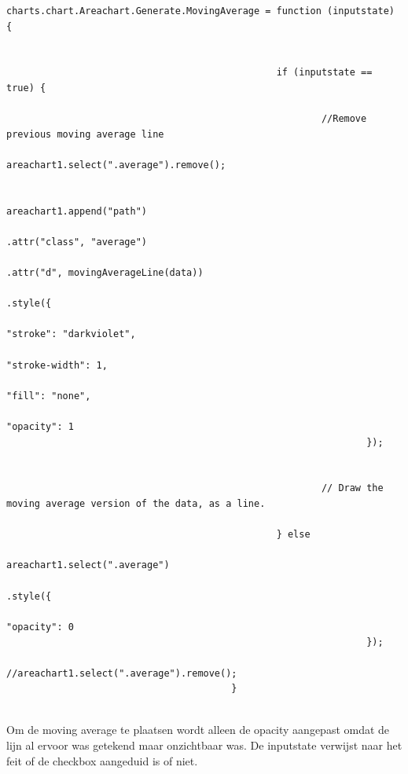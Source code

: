 \begin{lstlisting}[gobble=28]                                        
                                         charts.chart.Areachart.Generate.MovingAverage = function (inputstate) {


                                                if (inputstate == true) {
													
														//Remove previous moving average line
                                                        areachart1.select(".average").remove();

                                                        areachart1.append("path")
                                                                .attr("class", "average")
                                                                .attr("d", movingAverageLine(data))
                                                                .style({
                                                                        "stroke": "darkviolet",
                                                                        "stroke-width": 1,
                                                                        "fill": "none",
                                                                        "opacity": 1
                                                                });


                                                        // Draw the moving average version of the data, as a line.

                                                } else
                                                        areachart1.select(".average")
                                                                .style({
                                                                        "opacity": 0
                                                                });
                                                //areachart1.select(".average").remove();
                                        }
                                        
\end{lstlisting}
                  
Om de moving average te plaatsen wordt alleen de opacity aangepast omdat de lijn al ervoor was getekend maar onzichtbaar was. De inputstate verwijst naar het feit of de checkbox aangeduid is of niet.                 
                                        
